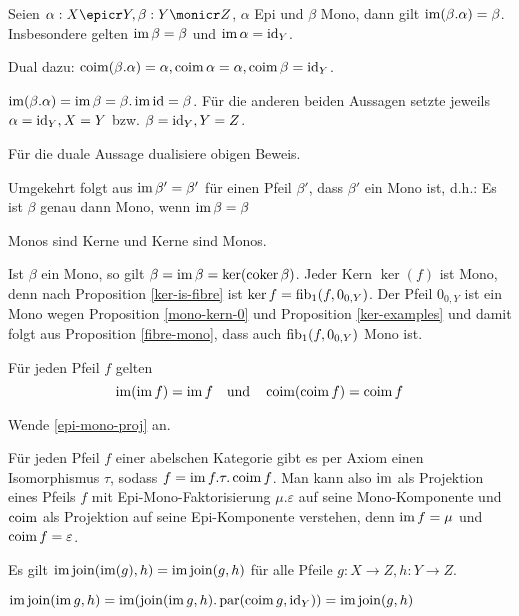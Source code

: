 \begin{korr}
Seien $\alpha : X \epicr Y, \beta : Y \monicr Z$, $\alpha$ Epi und $\beta$ Mono, dann gilt $\operatorname{im}(\beta.\alpha) = \beta$. Insbesondere gelten $\operatorname{im} \beta = \beta$ und $\operatorname{im} \alpha = \operatorname{id}_Y$.

Dual dazu: $\operatorname{coim}(\beta.\alpha) = \alpha, \operatorname{coim} \alpha = \alpha, \operatorname{coim} \beta = \operatorname{id}_Y$.
\end{korr}
\begin{bew}
$\operatorname{im}(\beta.\alpha) = \operatorname{im} \beta = \beta.\operatorname{im} \operatorname{id} = \beta$. Für die anderen beiden Aussagen setzte jeweils $\alpha = \operatorname{id}_Y, X=Y$ bzw. $\beta = \operatorname{id}_Y, Y=Z$.

Für die duale Aussage dualisiere obigen Beweis.
\end{bew}
\begin{bem}
Umgekehrt folgt aus $\operatorname{im}\beta' = \beta'$ für einen Pfeil $\beta'$, dass $\beta'$ ein Mono ist, d.h.:
Es ist $\beta$ genau dann Mono, wenn $\operatorname{im}\beta = \beta$
\end{bem}

\begin{korr}
Monos sind Kerne und Kerne sind Monos.
\end{korr}
\begin{bew}
Ist $\beta$ ein Mono, so gilt $\beta = \operatorname{im}\beta = \ker(\operatorname{coker}\beta)$.
Jeder Kern $\ker(f)$ ist Mono, denn nach Proposition \ref{ker-is-fibre} ist $\ker f = \operatorname{fib}_1(f,0_{0,Y})$.
Der Pfeil $0_{0,Y}$ ist ein Mono wegen Proposition \ref{mono-kern-0} und Proposition \ref{ker-examples} und damit folgt aus Proposition \ref{fibre-mono}, dass auch $\operatorname{fib}_1(f,0_{0,Y})$ Mono ist.
\end{bew}

\begin{korr}
Für jeden Pfeil $f$ gelten
\[ \operatorname{im}(\operatorname{im} f) = \operatorname{im} f \quad\text{und}\quad \operatorname{coim}(\operatorname{coim} f) = \operatorname{coim} f \]
\end{korr}
\begin{bew}
Wende \ref{epi-mono-proj} an.
\end{bew}

\begin{bem}
Für jeden Pfeil $f$ einer abelschen Kategorie gibt es per Axiom einen Isomorphismus $\tau$, sodass $f = \operatorname{im} f.\tau.\operatorname{coim} f$.
Man kann also $\operatorname{im}$ als Projektion eines Pfeils $f$ mit Epi-Mono-Faktorisierung $\mu.\varepsilon$ auf seine Mono-Komponente und $\operatorname{coim}$ als Projektion auf seine Epi-Komponente verstehen, denn $\operatorname{im} f = \mu$ und $\operatorname{coim} f = \varepsilon$.

\end{bem}

\begin{prop} \label{im-join-im-elim}
Es gilt $\operatorname{im}\operatorname{join}(\operatorname{im}(g),h) = \operatorname{im}\operatorname{join}(g,h)$ für alle Pfeile $g:X\to Z,h : Y\to Z$.
\end{prop}
\begin{bew}
$\operatorname{im}\operatorname{join}(\operatorname{im} g,h) = \operatorname{im}(\operatorname{join}(\operatorname{im} g,h).\operatorname{par}(\operatorname{coim} g,\operatorname{id}_Y)) = \operatorname{im}\operatorname{join}(g,h)$
\end{bew}
